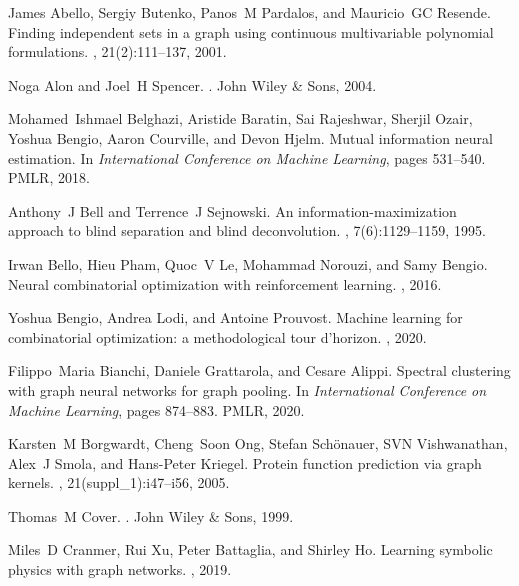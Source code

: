 \documentclass{article}
\begin{document}
\begin{thebibliography}{999}	
	James Abello, Sergiy Butenko, Panos~M Pardalos, and Mauricio~GC Resende.
	\newblock Finding independent sets in a graph using continuous multivariable
	polynomial formulations.
	, 21(2):111--137, 2001.
	
	Noga Alon and Joel~H Spencer.
	.
	\newblock John Wiley \& Sons, 2004.
	
	Mohamed~Ishmael Belghazi, Aristide Baratin, Sai Rajeshwar, Sherjil Ozair,
	Yoshua Bengio, Aaron Courville, and Devon Hjelm.
	\newblock Mutual information neural estimation.
	\newblock In {\em International Conference on Machine Learning}, pages
	531--540. PMLR, 2018.
	
	Anthony~J Bell and Terrence~J Sejnowski.
	\newblock An information-maximization approach to blind separation and blind
	deconvolution.
	, 7(6):1129--1159, 1995.
	
	Irwan Bello, Hieu Pham, Quoc~V Le, Mohammad Norouzi, and Samy Bengio.
	\newblock Neural combinatorial optimization with reinforcement learning.
	, 2016.
	
	Yoshua Bengio, Andrea Lodi, and Antoine Prouvost.
	\newblock Machine learning for combinatorial optimization: a methodological
	tour d’horizon.
	, 2020.
	
	Filippo~Maria Bianchi, Daniele Grattarola, and Cesare Alippi.
	\newblock Spectral clustering with graph neural networks for graph pooling.
	\newblock In {\em International Conference on Machine Learning}, pages
	874--883. PMLR, 2020.
	
	Karsten~M Borgwardt, Cheng~Soon Ong, Stefan Sch{\"o}nauer, SVN Vishwanathan,
	Alex~J Smola, and Hans-Peter Kriegel.
	\newblock Protein function prediction via graph kernels.
	, 21(suppl\_1):i47--i56, 2005.
	
	Thomas~M Cover.
	.
	\newblock John Wiley \& Sons, 1999.
	
	Miles~D Cranmer, Rui Xu, Peter Battaglia, and Shirley Ho.
	\newblock Learning symbolic physics with graph networks.
	, 2019.
	

\end{thebibliography}
\end{document}
